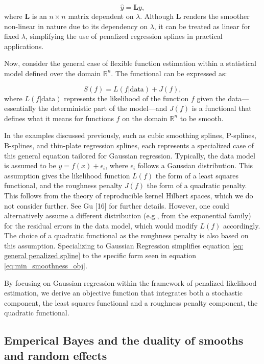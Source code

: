 \documentclass[
11pt, %
oneside, %
english, %
singlespacing, %
]{macthesis} %
\begin{document}
\[
\hat{y} = \mathbf{L}y,
\]
where \(\mathbf{L}\) is an \(n \times n\) matrix dependent on \(\lambda\). Although \(\mathbf{L}\) renders the smoother non-linear in nature due to its dependency on \(\lambda\), it can be treated as linear for fixed \(\lambda\), simplifying the use of penalized regression splines in practical applications.

Now, consider the general case of flexible function estimation within a statistical model defined over the domain \(\mathbb{R}^n\). The functional can be expressed as:

\begin{equation}
S(f) = L(f | \text{data}) + J(f),
\label{eq: general penalized spline}
\end{equation}
where \(L(f | \text{data})\) represents the likelihood of the function \(f\) given the data---essentially the deterministic part of the model---and \(J(f)\) is a functional that defines what it means for functions \(f\) on the domain \(\mathbb{R}^n\) to be smooth.

In the examples discussed previously, such as cubic smoothing splines, P-splines, B-splines, and thin-plate regression splines, each represents a specialized case of this general equation tailored for Gaussian regression. Typically, the data model is assumed to be \(y = f(x) + \epsilon_i\), where \(\epsilon_i\) follows a Gaussian distribution. This assumption gives the likelihood function \(L(f)\) the form of a least squares functional, and the roughness penalty \(J(f)\) the form of a quadratic penalty. This follows from the theory of reproducible kernel Hilbert spaces, which we do not consider further. See Gu {[}16{]} for further details. However, one could alternatively assume a different distribution (e.g., from the exponential family) for the residual errors in the data model, which would modify \(L(f)\) accordingly. The choice of a quadratic functional as the roughness penalty is also based on this assumption. Specializing to Gaussian Regression simplifies equation \ref{eq: general penalized spline} to the specific form seen in equation \ref{eq:min_smoothness_obj}.

By focusing on Gaussian regression within the framework of penalized likelihood estimation, we derive an objective function that integrates both a stochastic component, the least squares functional and a roughness penalty component, the quadratic functional.

\subsection{Emperical Bayes and the duality of smooths and random effects}\label{The-duality-of-smooths-and-random-effects}
\end{document}
